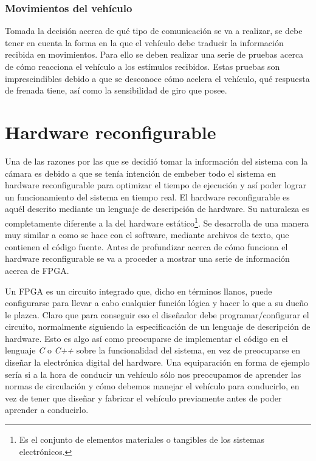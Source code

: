 \subsubsection{Movimientos del vehículo}

Tomada la decisión acerca de qué tipo de comunicación se va a realizar, se debe tener en cuenta la forma en la que el vehículo debe traducir la información recibida en movimientos. Para ello se deben realizar una serie de pruebas acerca de cómo reacciona el vehículo a los estímulos recibidos. Estas pruebas son imprescindibles debido a que se desconoce cómo acelera el vehículo, qué respuesta de frenada tiene, así como la sensibilidad de giro que posee.

\section{Hardware reconfigurable}\label{sec:hardwareReconfigurable}

Una de las razones por las que se decidió tomar la información del sistema con la cámara es debido a que se tenía intención de embeber todo el sistema en hardware reconfigurable para optimizar el tiempo de ejecución y así poder lograr un funcionamiento del sistema en tiempo real. El hardware reconfigurable es aquél descrito mediante un lenguaje de descripción de hardware. Su naturaleza es completamente diferente a la del hardware estático\footnote{Es el conjunto de elementos materiales o tangibles de los sistemas electrónicos.}. Se desarrolla de una manera muy similar a como se hace con el software, mediante archivos de texto, que contienen el código fuente. Antes de profundizar acerca de cómo funciona el hardware reconfigurable se va a proceder a mostrar una serie de información acerca de \ac{FPGA}. 

Un \ac{FPGA} es un circuito integrado que, dicho en términos llanos, puede configurarse para llevar a cabo cualquier función lógica y hacer lo que a su dueño le plazca. Claro que para conseguir eso el diseñador debe programar/configurar el circuito, normalmente siguiendo la especificación de un lenguaje de descripción de hardware. Esto es algo así como preocuparse de implementar el código en el lenguaje \emph{C} o \emph{C++} sobre la funcionalidad del sistema, en vez de preocuparse en diseñar la electrónica digital del hardware. Una equiparación en forma de ejemplo sería si a la hora de conducir un vehículo sólo nos preocupamos de aprender las normas de circulación y cómo debemos manejar el vehículo para conducirlo, en vez de tener que diseñar y fabricar el vehículo previamente antes de poder aprender a conducirlo.

